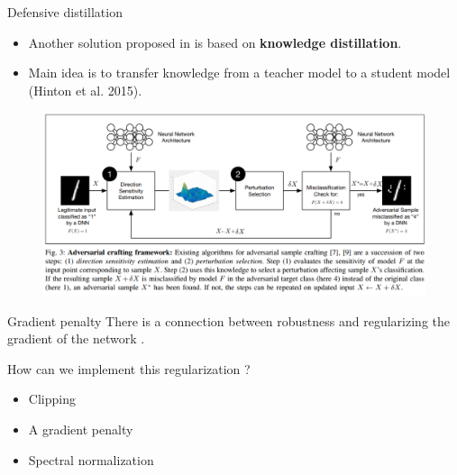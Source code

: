 \documentclass{beamer}
\begin{document}
\begin{frame}{Defensive distillation}
\begin{itemize}
    \item Another solution proposed in \cite{papernot2016distillation} is based on \textbf{knowledge distillation}. 
    \item Main idea is to transfer knowledge from a teacher model to a student model (Hinton et al. 2015).
\end{itemize}
\begin{figure}
        \centering
        \includegraphics[width=1.0\linewidth]{images/distillation_framework.PNG}
    \end{figure}
\end{frame}

\begin{frame}{Gradient penalty}
    There is a connection between robustness and regularizing the gradient of the network \cite{bietti2018regularization}.
    
    How can we implement this regularization ? 
    \begin{itemize}
        \item Clipping
        \item A gradient penalty
        \item Spectral normalization
    \end{itemize}
    
\end{frame}
\end{document}
